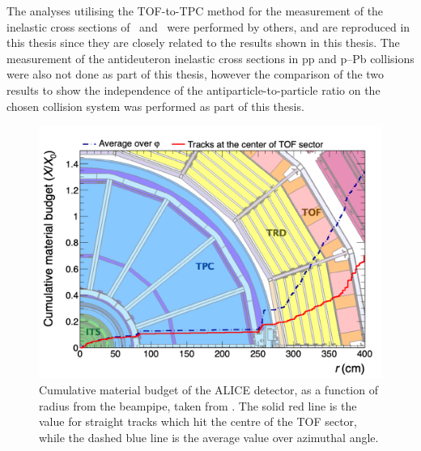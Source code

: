 The analyses utilising the TOF-to-TPC method for the measurement of the inelastic cross sections of \ahe\ and \atrit\ were performed by others, and are reproduced in this thesis since they are closely related to the results shown in this thesis. The measurement of the antideuteron inelastic cross sections in pp and p--Pb collisions were also not done as part of this thesis, however the comparison of the two results to show the independence of the antiparticle-to-particle ratio on the chosen collision system was performed as part of this thesis. 

\begin{figure}
		\centering
		\includegraphics[width=\textwidth]{figures/alice-material_0.png}
		\caption{Cumulative material budget of the ALICE detector, as a function of radius from the beampipe, taken from \cite{antideuteronXS}. The solid red line is the value for straight tracks which hit the centre of the TOF sector, while the dashed blue line is the average value over azimuthal angle.}
		\label{fig:ALICE_detector_material_budget}
\end{figure}    

